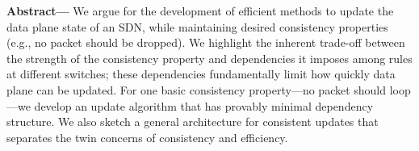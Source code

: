 \textbf{Abstract---}
We argue for the development of efficient methods to update the data plane state of an SDN, while maintaining desired consistency properties (e.g., no packet should be dropped). We highlight the inherent trade-off between the strength of the consistency property and dependencies it imposes among rules at different switches; these dependencies fundamentally limit how quickly data plane can be updated. For one basic consistency property---no packet should loop---we develop an update algorithm that has provably minimal dependency structure. We also sketch a general architecture for consistent updates that separates the twin concerns of consistency and efficiency.
